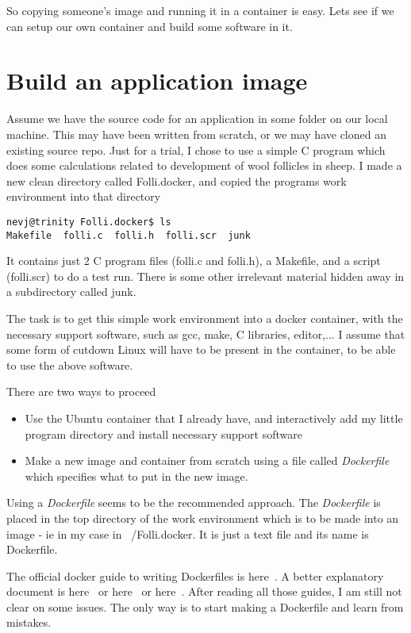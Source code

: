 \documentclass{article}  %
\begin{document}
So copying someone's image and running it in a container is easy.
Lets see if we can setup our own container and build some software in it.

\section{Build an application image}
Assume we have the source code for an application in some folder on our local machine. This may have been written from scratch, or we may have cloned an existing source repo. Just for a trial, I chose to use a simple C program which does some calculations related to development of wool follicles in sheep. I made a new clean directory called Folli.docker, and copied the  programs work environment into that directory
\begin{verbatim}
nevj@trinity Folli.docker$ ls
Makefile  folli.c  folli.h  folli.scr  junk
\end{verbatim}
It contains just 2 C program files (folli.c and folli.h), a Makefile, and a script (folli.scr) to do a test run. There is some other irrelevant material hidden away in a subdirectory called junk.

The task is to get this simple work environment into a docker container, with the necessary support software, such as gcc, make, C libraries, editor,... I assume that some form of cutdown Linux will have to be present in the container, to be able to use the above software.

There are two ways to proceed
\begin{itemize}
\item Use the Ubuntu container that I already have, and interactively add my little program directory and install necessary support software
\item Make a new image and container from scratch using a file called {\em Dockerfile} which specifies what to put in the new image.
\end{itemize}
Using a {\em Dockerfile} seems to be the recommended approach. The {\em Dockerfile} is placed in the top directory of the work environment which is to be made into an image - ie in my case in ~/Folli.docker. It is just a text file and its name is Dockerfile.

The official docker guide to writing Dockerfiles is here~\cite{dock:03}. A better explanatory document is here~\cite{dock:04} or here~\cite{dock:05} or here~\cite{dock:06}.
After reading all those guides, I am still not clear on some issues. The only way is to start making a Dockerfile and learn from mistakes. 
\end{document}
